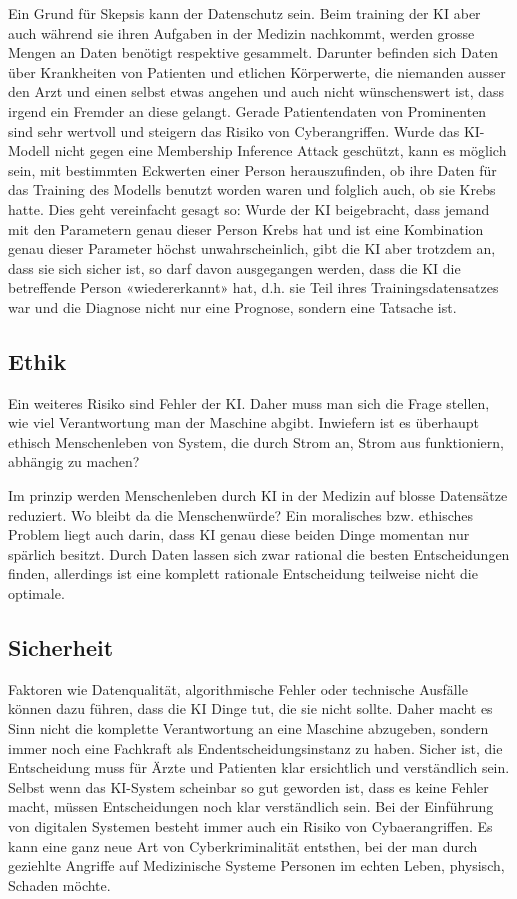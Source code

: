 Ein Grund für Skepsis kann der Datenschutz sein. Beim training der KI aber auch während sie ihren Aufgaben in der Medizin nachkommt, werden grosse Mengen an Daten benötigt respektive gesammelt. 
Darunter befinden sich Daten über Krankheiten von Patienten und etlichen Körperwerte, die niemanden ausser den Arzt und einen selbst etwas angehen und auch nicht wünschenswert ist, dass irgend ein Fremder an diese gelangt.
Gerade Patientendaten von Prominenten sind sehr wertvoll und steigern das Risiko von Cyberangriffen. 
\newline
\noindent
Wurde das KI-Modell nicht gegen
eine Membership Inference Attack geschützt, kann es möglich sein, mit bestimmten Eckwerten
einer Person herauszufinden, ob ihre Daten für das Training des Modells benutzt worden waren
und folglich auch, ob sie Krebs hatte. Dies geht vereinfacht gesagt so: Wurde der KI beigebracht,
dass jemand mit den Parametern genau dieser Person Krebs hat und ist eine Kombination genau
dieser Parameter höchst unwahrscheinlich, gibt die KI aber trotzdem an, dass sie sich sicher ist,
so darf davon ausgegangen werden, dass die KI die betreffende Person «wiedererkannt» hat, d.h.
sie Teil ihres Trainingsdatensatzes war und die Diagnose nicht nur eine Prognose, sondern eine
Tatsache ist. \citep{datenschutz-ki-achtsamkeit}

\subsection{\normalsize{Ethik}}
Ein weiteres Risiko sind Fehler der KI. Daher muss man sich die Frage stellen, wie viel Verantwortung man der Maschine abgibt.
Inwiefern ist es überhaupt ethisch Menschenleben von System, die durch Strom an, Strom aus funktioniern, abhängig zu machen?

Im prinzip werden Menschenleben durch KI in der Medizin auf blosse Datensätze reduziert. Wo bleibt da die Menschenwürde?
Ein moralisches bzw. ethisches Problem liegt auch darin, dass KI genau diese beiden Dinge momentan nur spärlich besitzt. 
Durch Daten lassen sich zwar rational  die besten Entscheidungen finden, allerdings ist eine komplett rationale Entscheidung teilweise nicht die optimale.

\subsection{\normalsize{Sicherheit}}
Faktoren wie Datenqualität, algorithmische Fehler oder technische Ausfälle können dazu führen, dass die KI Dinge tut, die sie nicht sollte. 
Daher macht es Sinn nicht die komplette Verantwortung an eine Maschine abzugeben, sondern immer noch eine Fachkraft als Endentscheidungsinstanz zu haben.
Sicher ist, die Entscheidung muss für Ärzte und Patienten klar ersichtlich und verständlich sein. Selbst wenn das KI-System scheinbar so gut geworden ist, dass es keine Fehler macht, 
müssen Entscheidungen noch klar verständlich sein. Bei der Einführung von digitalen Systemen besteht immer auch ein  Risiko von Cybaerangriffen.
Es kann eine ganz neue Art von Cyberkriminalität entsthen, bei der man durch geziehlte Angriffe auf Medizinische Systeme Personen im echten Leben, physisch, Schaden möchte.

